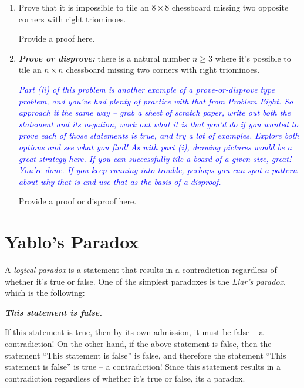 \documentclass{article}
\renewcommand{\(}{\left(}
\renewcommand{\)}{\right)}
\theoremstyle{plain}
\theoremstyle{plain}
\theoremstyle{definition}
\begin{document}
\begin{enumerate}[label*=\roman*.,ref=\roman*]

\item Prove that it is impossible to tile an $8 \times 8$ chessboard missing
two opposite corners with right triominoes.

\begin{shaded}
Provide a proof here.
\end{shaded}

\item \textit{\textbf{Prove or disprove:}} there is a natural number $n \ge 3$ where it's possible to tile an $n \times n$ chessboard missing two corners with right triominoes.

\textit{\textcolor{blue}{ Part (ii) of this problem is another example of a prove-or-disprove type problem, and you've had plenty of practice with that from Problem Eight. So approach it the same way -- grab a sheet of scratch paper, write
out both the statement and its negation, work out what it is that you'd do if you wanted to prove each of
those statements is true, and try a lot of examples. Explore both options and see what you find! As with
part (i), drawing pictures would be a great strategy here. If you can successfully tile a board of a given size,
great! You're done. If you keep running into trouble, perhaps you can spot a pattern about why that is and
use that as the basis of a disproof. }}

\begin{shaded}
Provide a proof or disproof here.
\end{shaded}

\end{enumerate}

\section{Yablo's Paradox}

A \emph{logical paradox} is a statement that results in a contradiction
regardless of whether it's true or false.
One of the simplest paradoxes is the \emph{Liar's paradox},
which is the following:
\begin{center}
\textbf{\textit{This statement is false.}}
\end{center}
If this statement is true,
then by its own admission, it must be false -- a contradiction!
On the other hand, if the above statement is false, then the statement ``This statement is false'' is false, and therefore the
statement ``This statement is false'' is true -- a contradiction!
Since this statement results in a contradiction regardless of whether
it's true or false, its a paradox. \\
\end{document}
